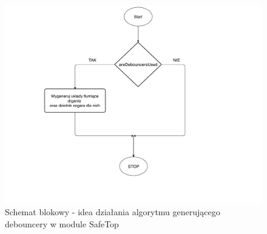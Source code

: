 \documentclass[12pt] {article}
\begin{document}
\begin{figure}[H]
\centering
\includegraphics[width=\textwidth]{res/HDL_Generate.pdf}
\caption{Schemat blokowy - idea działania algorytmu generującego debouncery w module SafeTop}
\label{fig:deb}
\end{figure}
\end{document}
